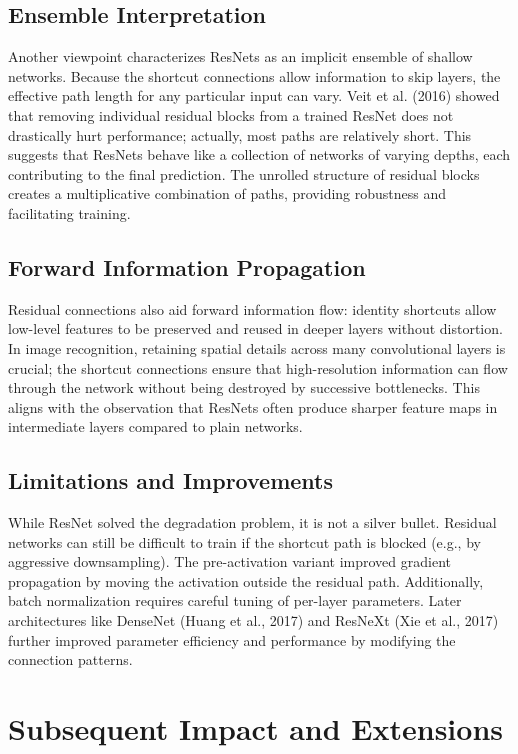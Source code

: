 \documentclass[11pt,a4paper]{article}
\begin{document}
\subsection{Ensemble Interpretation}
Another viewpoint characterizes ResNets as an implicit ensemble of shallow networks. Because the shortcut connections allow information to skip layers, the effective path length for any particular input can vary. Veit et al. (2016) showed that removing individual residual blocks from a trained ResNet does not drastically hurt performance; actually, most paths are relatively short. This suggests that ResNets behave like a collection of networks of varying depths, each contributing to the final prediction. The unrolled structure of residual blocks creates a multiplicative combination of paths, providing robustness and facilitating training.

\subsection{Forward Information Propagation}
Residual connections also aid forward information flow: identity shortcuts allow low-level features to be preserved and reused in deeper layers without distortion. In image recognition, retaining spatial details across many convolutional layers is crucial; the shortcut connections ensure that high-resolution information can flow through the network without being destroyed by successive bottlenecks. This aligns with the observation that ResNets often produce sharper feature maps in intermediate layers compared to plain networks.

\subsection{Limitations and Improvements}
While ResNet solved the degradation problem, it is not a silver bullet. Residual networks can still be difficult to train if the shortcut path is blocked (e.g., by aggressive downsampling). The pre-activation variant improved gradient propagation by moving the activation outside the residual path. Additionally, batch normalization requires careful tuning of per-layer parameters. Later architectures like DenseNet (Huang et al., 2017) and ResNeXt (Xie et al., 2017) further improved parameter efficiency and performance by modifying the connection patterns.

\section{Subsequent Impact and Extensions}
\label{sec:extensions}
\end{document}
